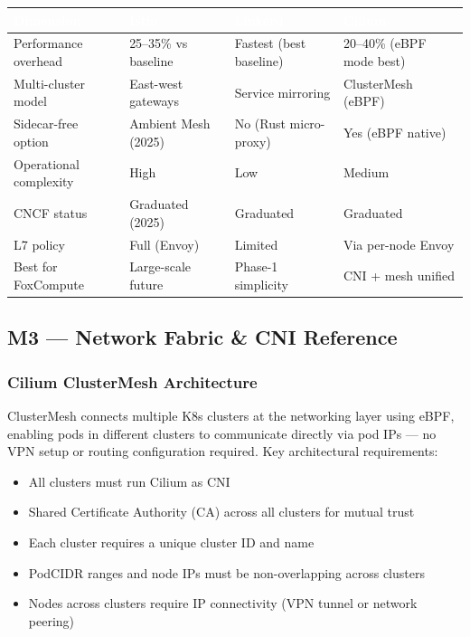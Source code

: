 \documentclass[11pt,letterpaper]{article}
\newcommand{\tableheader}[1]{\textbf{\sffamily\textcolor{white}{#1}}}
\begin{document}
\begin{center}
\begin{tabularx}{\textwidth}{L{3cm}L{2.8cm}L{2.8cm}X}
\toprule
{}
\tableheader{Dimension} & \tableheader{Istio} & \tableheader{Linkerd} & \tableheader{Cilium} \\
\midrule
Performance overhead & 25--35\% vs baseline & Fastest (best baseline) & 20--40\% (eBPF mode best) \\
Multi-cluster model & East-west gateways & Service mirroring & ClusterMesh (eBPF) \\
Sidecar-free option & Ambient Mesh (2025) & No (Rust micro-proxy) & Yes (eBPF native) \\
Operational complexity & High & Low & Medium \\
CNCF status & Graduated (2025) & Graduated & Graduated \\
L7 policy & Full (Envoy) & Limited & Via per-node Envoy \\
Best for FoxCompute & Large-scale future & Phase-1 simplicity & CNI + mesh unified \\
\bottomrule
\end{tabularx}
\end{center}

\subsection{M3 --- Network Fabric \& CNI Reference}

\subsubsection{Cilium ClusterMesh Architecture}

ClusterMesh connects multiple K8s clusters at the networking layer using eBPF, enabling pods in different clusters to communicate directly via pod IPs --- no VPN setup or routing configuration required. Key architectural requirements:

\begin{itemize}[leftmargin=1.5em]
  \item All clusters must run Cilium as CNI
  \item Shared Certificate Authority (CA) across all clusters for mutual trust
  \item Each cluster requires a unique cluster ID and name
  \item PodCIDR ranges and node IPs must be non-overlapping across clusters
  \item Nodes across clusters require IP connectivity (VPN tunnel or network peering)
\end{itemize}
\end{document}
